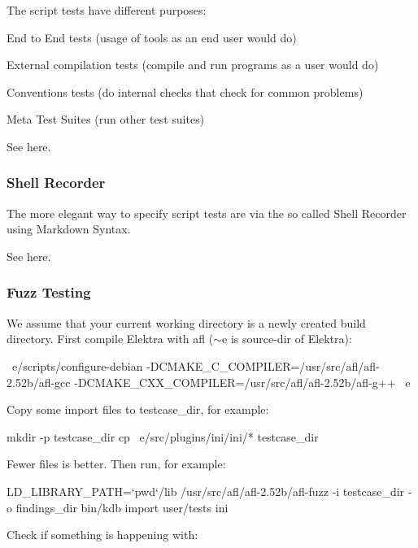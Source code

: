 The script tests have different purposes\+:


\begin{DoxyItemize}
\item End to End tests (usage of tools as an end user would do)
\item External compilation tests (compile and run programs as a user would do)
\item Conventions tests (do internal checks that check for common problems)
\item Meta Test Suites (run other test suites)
\end{DoxyItemize}

See here.

\subsubsection*{Shell Recorder}

The more elegant way to specify script tests are via the so called Shell Recorder using Markdown Syntax.

See here.

\subsubsection*{Fuzz Testing}

We assume that your current working directory is a newly created build directory. First compile Elektra with afl ($\sim$e is source-\/dir of Elektra)\+:


\begin{DoxyCode}
~e/scripts/configure-debian -DCMAKE\_C\_COMPILER=/usr/src/afl/afl-2.52b/afl-gcc
       -DCMAKE\_CXX\_COMPILER=/usr/src/afl/afl-2.52b/afl-g++ ~e
\end{DoxyCode}


Copy some import files to {\ttfamily testcase\+\_\+dir}, for example\+:


\begin{DoxyCode}
mkdir -p testcase\_dir
cp ~e/src/plugins/ini/ini/* testcase\_dir
\end{DoxyCode}


Fewer files is better. Then run, for example\+:


\begin{DoxyCode}
LD\_LIBRARY\_PATH=`pwd`/lib /usr/src/afl/afl-2.52b/afl-fuzz -i testcase\_dir -o findings\_dir bin/kdb import
       user/tests ini
\end{DoxyCode}


Check if something is happening with\+:



